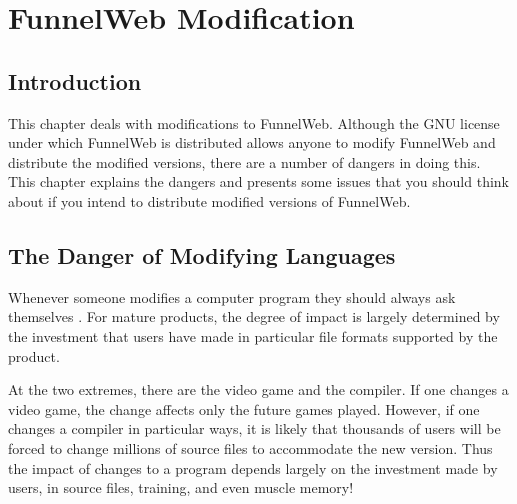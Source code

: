 %
%

\chapter{FunnelWeb Modification}
\label{chapmod}

\section{Introduction}

This chapter deals with modifications to FunnelWeb. Although the
GNU license
under which FunnelWeb is distributed allows anyone to
modify FunnelWeb and distribute the modified versions, there are a number of
dangers in doing this. This chapter explains the dangers and presents
some issues that you should think about if you intend to
distribute modified versions of FunnelWeb.

\section{The Danger of Modifying Languages}

Whenever someone modifies a computer program they should always ask
themselves . For mature products, the degree of impact is largely determined
by the investment that users have made in particular file formats
supported by the product.

At the two extremes, there are the video game and the
compiler.
If one changes a video game, the change affects only the future games
played. However, if one changes a compiler in particular ways,
it is likely that thousands of users will be forced to change millions
of source files to accommodate the new version. Thus the impact of changes
to a program depends largely on the investment made by users, in
source files, training, and even muscle memory!

